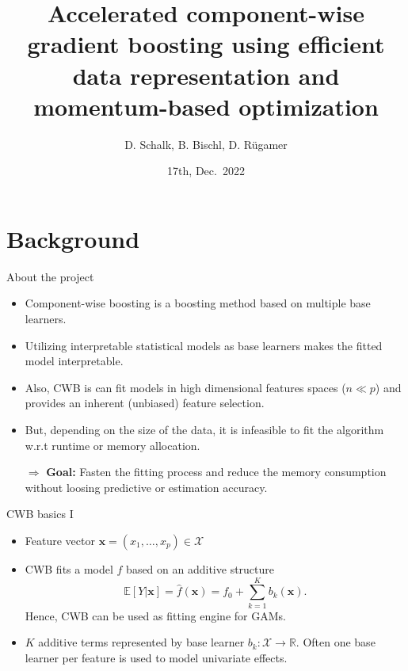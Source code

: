\documentclass[ignorenonframetext,]{beamer}
\title{Accelerated component-wise gradient boosting using efficient data
representation and momentum-based optimization}
\author{D. Schalk, B. Bischl, D. Rügamer}
\date{17th, Dec.~2022}
\providecommand{\tightlist}{%
  \setlength{\itemsep}{0pt}\setlength{\parskip}{0pt}}
\newcommand{\fh}{\hat{f}}
\begin{document}
\begin{frame}[plain]
\titlepage
\end{frame}


\hypertarget{background}{%
\section{Background}\label{background}}

\begin{frame}{About the project}
\protect\hypertarget{about-the-project}{}
\begin{itemize}
\tightlist
\item
  Component-wise boosting
  \citep[CWB;][]{buhlmann2003boosting,buhlmann2007boosting} is a
  boosting method based on multiple base learners.
\item
  Utilizing interpretable statistical models as base learners makes the
  fitted model interpretable.
\item
  Also, CWB is can fit models in high dimensional features spaces
  (\(n \ll p\)) and provides an inherent (unbiased) feature selection.
\item
  But, depending on the size of the data, it is infeasible to fit the
  algorithm w.r.t runtime or memory allocation.
\end{itemize}

\begin{itemize}
\item[$\Rightarrow$] \textbf{Goal:} Fasten the fitting process and reduce the memory consumption without loosing predictive or estimation accuracy.
\end{itemize}
\end{frame}

\begin{frame}{CWB basics I}
\protect\hypertarget{cwb-basics-i}{}
\begin{itemize}
\tightlist
\item
  Feature vector \(\bm{x} = (x_1, \dots, x_p)\in\mathcal{X}\)
\item
  CWB fits a model \(\fh\) based on an additive structure
  \[\mathbb{E}[Y|\bm{x}] = \fh(\bm{x}) = f_0 + \sum_{k=1}^K b_k(\bm{x}).\]
  Hence, CWB can be used as fitting engine for GAMs.
\item
  \(K\) additive terms represented by base learner
  \(b_k : \mathcal{X} \to \mathbb{R}\). Often one base learner per
  feature is used to model univariate effects.
\end{itemize}
\end{frame}
\end{document}
